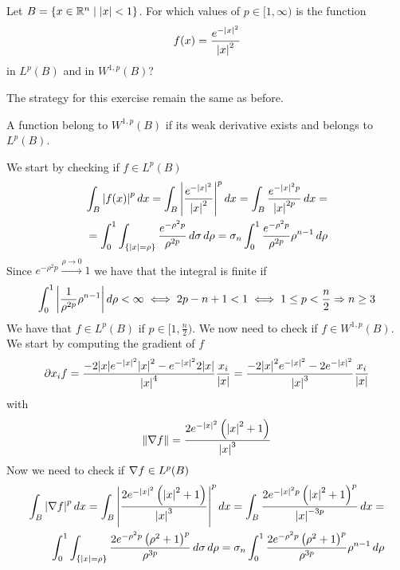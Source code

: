     \newpage
\begin{exercise}
    Let \(B = \left\{ x \in \mathbb{R}^n \mid \abs{x} < 1 \right\}\). For which values of \(p \in [1, \infty) \) is the function
    \[
        f(x) = \frac{e^{-\abs{x}^2}}{\abs{x}^2}
    \]
    in \(L^p(B)\) and in \(W^{1, p}(B)\)?
\end{exercise}
The strategy for this exercise remain the same as before.
\begin{remark}
    A function belong to \(W^{1, p}(B)\) if its weak derivative exists and belongs to \(L^p(B)\).
\end{remark}
We start by checking if \(f \in L^p(B)\)
\[
    \begin{split}
        \int_B \abs{f(x)}^p \, dx = \int_B \abs{\frac{e^{-\abs{x}^2}}{\abs{x}^2}}^p \, dx = \int_B \frac{e^{-\abs{x}^2p}}{\abs{x}^{2p}} \, dx = \\
        = \int_0^1 \int_{\left\{\abs{x} = \rho\right\}} \frac{e^{-\rho^2 p}}{\rho^{2p}} \, d\sigma \, d\rho = \sigma_n \int_0^1 \frac{e^{-\rho^2 p}}{\rho^{2p}} \rho^{n-1} \, d\rho
    \end{split}
\]
Since \(e^{-\rho^2 p} \overset{\rho \to 0}{\longrightarrow} 1\) we have that the integral is finite if
\[
    \begin{split}
        \int_0^1 \abs{\frac{1}{\rho^{2p}} \rho^{n-1}} \, d\rho < \infty \iff 2p - n + 1 < 1 \iff 1 \leq p < \frac{n}{2} \Rightarrow n \geq 3
    \end{split}
\]
We have that \(f \in L^p(B)\) if \(p \in [1, \frac{n}{2})\). We now need to check if \(f \in W^{1, p}(B)\). We start by computing the gradient of \(f\)
\[
    \begin{split}
        \partial x_i f = \frac{-2 \abs{x} e^{-\abs{x}^2} \abs{x}^2 - e^{-\abs{x}^2} 2\abs{x}}{\abs{x}^4} \frac{x_i}{\abs{x}} = \frac{-2 \abs{x}^2 e^{-\abs{x}^2} - 2 e^{-\abs{x}^2}}{\abs{x}^3} \frac{x_i}{\abs{x}} 
    \end{split}
\]
with 
\[
    \begin{split}
        \norm{\nabla f} = \frac{2 e^{-\abs{x}^2} \left(\abs{x}^2 + 1\right)}{\abs{x}^3}
    \end{split}
\]
Now we need to check if \(\nabla f \in L^p(B)\)
\[
    \begin{split}
        \int_B \abs{\nabla f}^p \, dx = \int_B \abs{\frac{2 e^{-\abs{x}^2} \left(\abs{x}^2 + 1\right)}{\abs{x}^3}}^p \, dx = \int_B  \frac{2e^{-\abs{x}^2p} \left(\abs{x}^2 + 1\right)^p} {\abs{x}^{-3p}} \, dx = \\
        \int_0^1 \int_{\left\{\abs{x} = \rho\right\}}  \frac{2e^{-\rho^2 p} \left(\rho^2 + 1\right)^p} {\rho^{3p}} \, d\sigma \, d\rho = \sigma_n \int_0^1  \frac{2e^{-\rho^2 p} \left(\rho^2 + 1\right)^p} {\rho^{3p}} \rho^{n-1} \, d\rho
    \end{split}
\]
